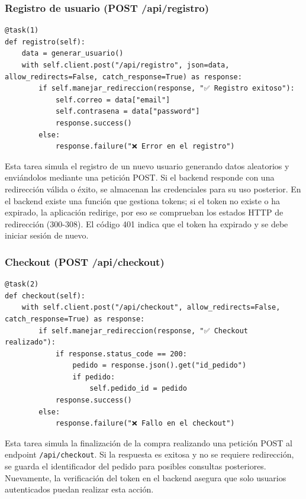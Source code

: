 \documentclass[10pt]{book}
\begin{document}
\subsubsection{Registro de usuario (POST /api/registro)}

\begin{lstlisting}[style=pythonclean, caption={Tarea para registrar un nuevo usuario}]
@task(1)
def registro(self):
    data = generar_usuario()
    with self.client.post("/api/registro", json=data, allow_redirects=False, catch_response=True) as response:
        if self.manejar_redireccion(response, "✅ Registro exitoso"):
            self.correo = data["email"]
            self.contrasena = data["password"]
            response.success()
        else:
            response.failure("❌ Error en el registro")
\end{lstlisting}

Esta tarea simula el registro de un nuevo usuario generando datos aleatorios y enviándolos mediante una petición POST. Si el backend responde con una redirección válida o éxito, se almacenan las credenciales para su uso posterior. En el backend existe una función que gestiona tokens; si el token no existe o ha expirado, la aplicación redirige, por eso se comprueban los estados HTTP de redirección (300-308). El código 401 indica que el token ha expirado y se debe iniciar sesión de nuevo.

\newpage
\subsubsection{Checkout (POST /api/checkout)}

\begin{lstlisting}[style=pythonclean, caption={Tarea para realizar el checkout}]
@task(2)
def checkout(self):
    with self.client.post("/api/checkout", allow_redirects=False, catch_response=True) as response:
        if self.manejar_redireccion(response, "✅ Checkout realizado"):
            if response.status_code == 200:
                pedido = response.json().get("id_pedido")
                if pedido:
                    self.pedido_id = pedido
            response.success()
        else:
            response.failure("❌ Fallo en el checkout")
\end{lstlisting}

Esta tarea simula la finalización de la compra realizando una petición POST al endpoint \texttt{/api/checkout}. Si la respuesta es exitosa y no se requiere redirección, se guarda el identificador del pedido para posibles consultas posteriores. Nuevamente, la verificación del token en el backend asegura que solo usuarios autenticados puedan realizar esta acción.
\end{document}
